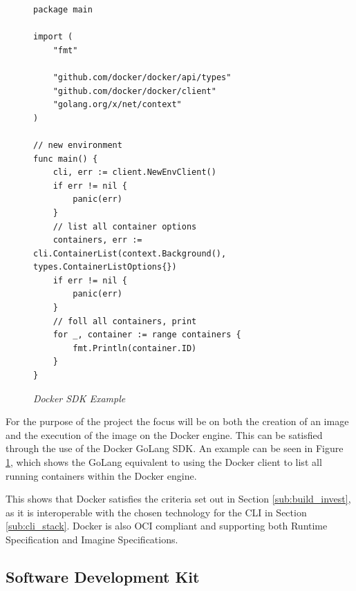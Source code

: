 \begin{figure}[!ht]
\begin{lstlisting}
package main

import (
	"fmt"

	"github.com/docker/docker/api/types"
	"github.com/docker/docker/client"
	"golang.org/x/net/context"
)

// new environment
func main() {
	cli, err := client.NewEnvClient()
	if err != nil {
		panic(err)
	}
    // list all container options
	containers, err := cli.ContainerList(context.Background(), types.ContainerListOptions{})
	if err != nil {
		panic(err)
	}
    // foll all containers, print
	for _, container := range containers {
		fmt.Println(container.ID)
	}
}
\end{lstlisting}
\caption{\em Docker SDK Example}
\label{fig:doc_example}
\end{figure}

For the purpose of the project the focus will be on both the creation of an image and the execution of the image on the \gls{Docker} engine. This can be satisfied through the use of the \gls{Docker} \gls{GoLang} \gls{SDK}. An example can be seen in Figure \ref{fig:doc_example}, which shows the \gls{GoLang} equivalent to using the \gls{Docker} client to list all running containers within the \gls{Docker} engine.

This shows that \gls{Docker} satisfies the criteria set out in Section \ref{sub:build_invest}, as it is interoperable with the chosen technology for the \gls{CLI} in Section \ref{sub:cli_stack}. Docker is also \gls{OCI} compliant and supporting both Runtime Specification and Imagine Specifications.


\subsection{Software Development Kit}
\label{sub:sdk_stack}

